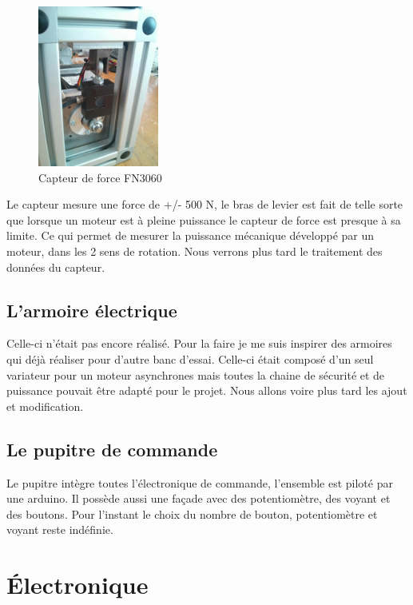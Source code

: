\documentclass[11pt]{article}
\begin{document}
\begin{figure}[!h]
    \centering
    \includegraphics[width=150px]{IMG_20160628_183033.jpg}
    \caption{Capteur de force FN3060}
\end{figure}
\newpage

Le capteur mesure une force de +/- 500 N, le bras de levier est fait de telle sorte que lorsque un moteur est à pleine puissance le capteur de force est presque à sa limite. Ce qui permet de mesurer la puissance mécanique développé par un moteur, dans les 2 sens de rotation. Nous verrons plus tard le traitement des données du capteur.

\subsection{L'armoire électrique}

Celle-ci n'était pas encore réalisé. Pour la faire je me suis inspirer des armoires qui déjà réaliser pour d'autre banc d'essai. Celle-ci était composé d'un seul variateur pour un moteur asynchrones mais toutes la chaine de sécurité et de puissance pouvait être adapté pour le projet. Nous allons voire plus tard les ajout et modification.

\subsection{Le pupitre de commande}
Le pupitre intègre toutes l'électronique de commande, l'ensemble est piloté par une arduino. Il possède aussi une façade avec des potentiomètre, des voyant et des boutons. Pour l'instant le choix du nombre de bouton, potentiomètre et voyant reste indéfinie.



\section{Électronique}
\end{document}
